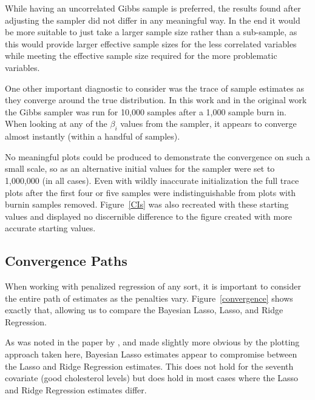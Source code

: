 \documentclass{uwstat572}
\begin{document}
While having an uncorrelated Gibbs sample is preferred, the results found after adjusting the sampler did not differ in any meaningful way. In the end it would be more suitable to just take a larger sample size rather than a sub-sample, as this would provide larger effective sample sizes for the less correlated variables while meeting the effective sample size required for the more problematic variables.

One other important diagnostic to consider was the trace of sample estimates as they converge around the true distribution. In this work and in the original work the Gibbs sampler was run for 10,000 samples after a 1,000 sample burn in. When looking at any of the $\beta_i$ values from the sampler, it appears to converge almost instantly (within a handful of samples). 

No meaningful plots could be produced to demonstrate the convergence on such a small scale, so as an alternative initial values for the sampler were set to 1,000,000 (in all cases). Even with wildly inaccurate initialization the full trace plots after the first four or five samples were indistinguishable from plots with burnin samples removed. Figure~\ref{CIs} was also recreated with these starting values and displayed no discernible difference to the figure created with more accurate starting values.

\subsection{Convergence Paths}
When working with penalized regression of any sort, it is important to consider the entire path of estimates as the penalties vary. Figure~\ref{convergence} shows exactly that, allowing us to compare the Bayesian Lasso, Lasso, and Ridge Regression. 

As was noted in the paper by \cite{park2008bayesian}, and made slightly more obvious by the plotting approach taken here, Bayesian Lasso estimates appear to compromise between the Lasso and Ridge Regression estimates. This does not hold for the seventh covariate (good cholesterol levels) but does hold in most cases where the Lasso and Ridge Regression estimates differ.
\end{document}
